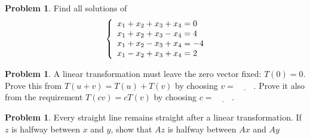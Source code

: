 \documentclass[10pt]{article}
\theoremstyle{definition}
\newtheorem{problem}[theorem]{Problem}
\newcommand{\1}[1]{\textbf{1}_{\left[#1\right]}} %
\begin{document}
\begin{problem}
  Find all solutions of
  \begin{equation*}
    \left\{ \begin{array}{l@{}l}
        x_{1}+x_{2}+x_{3}+x_{4}=0\\
        x_{1}+x_{2}+x_{3}-x_{4}=4\\
        x_{1}+x_{2}-x_{3}+x_{4}=-4\\
        x_{1}-x_{2}+x_{3}+x_{4}=2\\
      \end{array}\right.
  \end{equation*}
\end{problem}


\begin{problem}
  A linear transformation must leave the zero vector fixed: $T(0)=0$. Prove
  this from $T(u+v)=T(u)+T(v)$ by choosing $v=\underline{\phantom{hello}}$.
  Prove it also from the requirement $T(cv)=cT(v)$ by choosing
  $c=\underline{\phantom{hello}}$.
\end{problem}

\begin{problem}
  Every straight line remains straight after a linear transformation. If $z$
  is halfway between $x$ and $y$, show that $Az$ is halfway between $Ax$ and
  $Ay$
\end{problem}
\end{document}
